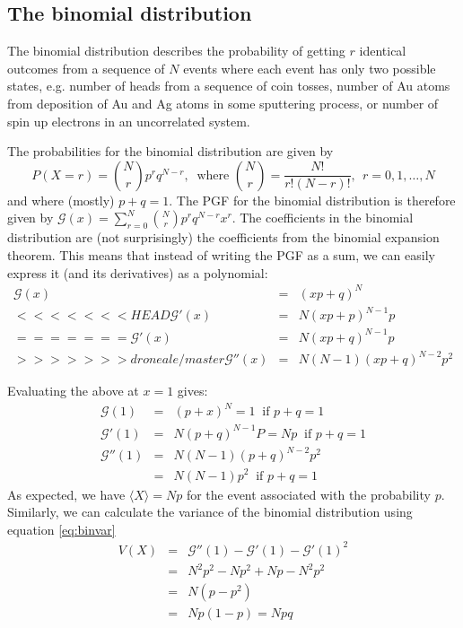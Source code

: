 \documentclass{article}
\newcommand{\calG}{\mathcal{G}}
\begin{document}

\subsection*{The binomial distribution}
The binomial distribution describes the probability of getting $r$ identical outcomes from a sequence of $N$ events where each event has only two possible states, e.g. number of heads from a sequence of coin tosses, number of Au atoms from deposition of Au and Ag atoms in some sputtering process, or number of spin up electrons in an uncorrelated system.

The probabilities for the binomial distribution are given by
$$P(X=r) = \binom{N}{r}p^rq^{N-r}, ~\text{ where } \binom{N}{r} = \frac{N!}{r!(N-r)!}, ~~r=0,1,\ldots,N$$
and where (mostly) $p+q=1$.
The PGF for the binomial distribution is therefore given by $\calG(x) = \sum_{r=0}^N\binom{N}{r}p^rq^{N-r}x^r$. 
The coefficients in the binomial distribution are (not surprisingly) the coefficients from the  binomial expansion theorem. This means that instead of writing the PGF as a sum, we can easily express it (and its derivatives) as a polynomial:
\begin{eqnarray*}
	\calG(x)  &=& (xp +q)^N \\
<<<<<<< HEAD
	\calG'(x) &=& N(xp+p)^{N-1}p\\
=======
	\calG'(x) &=& N(xp+q)^{N-1}p\\
>>>>>>> droneale/master
	\calG''(x) &=& N(N-1)(xp+q)^{N-2}p^2
\end{eqnarray*}

Evaluating the above at $x=1$ gives:
	\begin{eqnarray*}
	\calG(1) &=& (p+x)^N = 1 ~\text{ if } p+q=1\\
	\calG'(1) &=& N(p+q)^{N-1}P = Np  ~\text{ if } p+q=1\\
	\calG''(1) &=& N(N-1)(p+q)^{N-2}p^2 \\
		&=&N(N-1)p^2  ~\text{ if } p+q=1
\end{eqnarray*}
As expected, we have $\langle X\rangle =Np$ for the event associated with the probability $p$.
Similarly, we can calculate the variance of the binomial distribution using equation \ref{eq:binvar}
\begin{eqnarray*}
	V(X) &=&\calG''(1) - \calG'(1) -\calG'(1)^2\\
		&=& N^2p^2-Np^2+Np-N^2p^2\\
		&=& N(p-p^2)\\
		&=& Np(1-p)= Npq
\end{eqnarray*}
\end{document}
